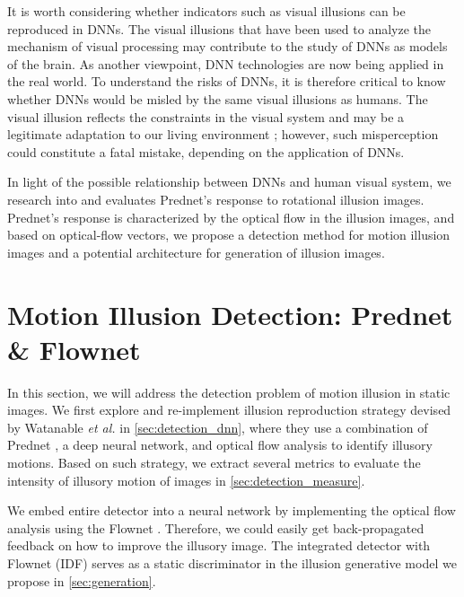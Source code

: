 \documentclass[journal]{IEEEtran}
\begin{document}
It is worth considering whether indicators such as visual illusions can be reproduced in DNNs. The visual illusions that have been used to analyze the mechanism of visual processing may contribute to the study of DNNs as models of the brain. As another viewpoint, DNN technologies are now being applied in the real world. To understand the risks of DNNs, it is therefore critical to know whether DNNs would be misled by the same visual illusions as humans. The visual illusion reflects the constraints in the visual system and may be a legitimate adaptation to our living environment \cite{eagleman2001visual}; however, such misperception could constitute a fatal mistake, depending on the application of DNNs.

In light of the possible relationship between DNNs and human visual system, we research into and evaluates Prednet's response to rotational illusion images. Prednet's response is characterized by the optical flow in the illusion images, and based on optical-flow vectors, we propose a detection method for motion illusion images and a potential architecture for generation of illusion images.

\section{Motion Illusion Detection: Prednet \& Flownet}
\label{sec:detection}
In this section, we will address the detection problem of motion illusion in static images.
We first explore and re-implement illusion reproduction strategy devised by Watanable \textit{et al.} \cite{watanable2018illusory} in \cref{sec:detection_dnn}, where they use a combination of Prednet \cite{lotter2016deep}, a deep neural network, and optical flow analysis to identify illusory motions.
Based on such strategy, we extract several metrics to evaluate the intensity of illusory motion of images in \cref{sec:detection_measure}.

We embed entire detector into a neural network by implementing the optical flow analysis using the Flownet \cite{ilg2017flownet}.
Therefore, we could easily get back-propagated feedback on how to improve the illusory image.
The integrated detector with Flownet (IDF) serves as a static discriminator in the illusion generative model we propose in \cref{sec:generation}.
\end{document}
